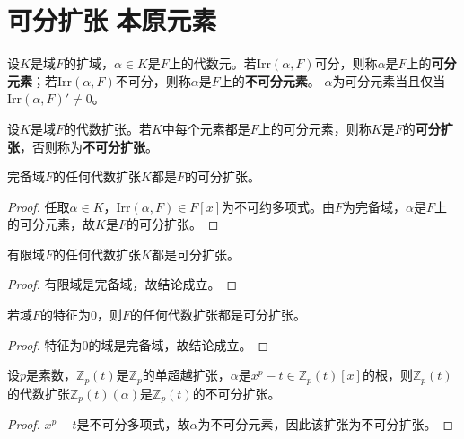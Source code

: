 \documentclass[../../main.tex]{subfiles}%
\begin{document}
\section{可分扩张$\,\,$本原元素}

\begin{definition}
设$K$是域$F$的扩域，$\alpha\in K$是$F$上的代数元。若$\mathrm{Irr}(\alpha,F)$可分，则称$\alpha$是$F$上的\textbf{可分元素}；若$\mathrm{Irr}(\alpha,F)$不可分，则称$\alpha$是$F$上的\textbf{不可分元素}。
$\alpha$为可分元素当且仅当$\mathrm{Irr}(\alpha,F)'\neq0$。
\end{definition}

\begin{definition}
设$K$是域$F$的代数扩张。若$K$中每个元素都是$F$上的可分元素，则称$K$是$F$的\textbf{可分扩张}，否则称为\textbf{不可分扩张}。
\end{definition}

\begin{example}
完备域$F$的任何代数扩张$K$都是$F$的可分扩张。
\end{example}
\begin{proof}

任取$\alpha\in K$，$\mathrm{Irr}(\alpha,F)\in F[x]$为不可约多项式。由$F$为完备域，$\alpha$是$F$上的可分元素，故$K$是$F$的可分扩张。

\end{proof}

\begin{example}
有限域$F$的任何代数扩张$K$都是可分扩张。
\end{example}
\begin{proof}

有限域是完备域，故结论成立。

\end{proof}

\begin{example}
若域$F$的特征为$0$，则$F$的任何代数扩张都是可分扩张。
\end{example}
\begin{proof}

特征为$0$的域是完备域，故结论成立。

\end{proof}

\begin{example}
设$p$是素数，$\mathbb{Z}_p(t)$是$\mathbb{Z}_p$的单超越扩张，$\alpha$是$x^p-t\in\mathbb{Z}_p(t)[x]$的根，则$\mathbb{Z}_p(t)$的代数扩张$\mathbb{Z}_p(t)(\alpha)$是$\mathbb{Z}_p(t)$的不可分扩张。
\end{example}
\begin{proof}

$x^p-t$是不可分多项式，故$\alpha$为不可分元素，因此该扩张为不可分扩张。

\end{proof}
\end{document}
